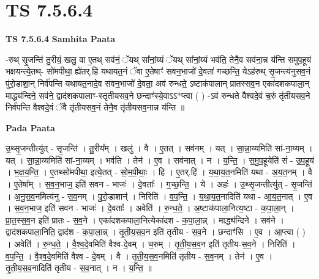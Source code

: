 \documentclass[17pt]{extarticle}
\begin{document}
\section*{ TS 7.5.6.4 }

\textbf{TS 7.5.6.4 } \newline
\textbf{Samhita Paata} \newline

-रुथ् सृ॒जन्ति॑ तु॒रीयं॒ खलु॒ वा ए॒तथ् सव॑नं॒ ॅयथ् सा᳚नां॒य्यं ॅयथ् सा᳚नां॒य्यं भव॑ति॒ तेनै॒व सव॑ना॒न्न य॑न्ति समुप॒हूय॑ भक्षयन्त्ये॒तथ्- सो॑मपीथा॒ ह्ये॑तर्.हि॑ यथायत॒नं ॅवा ए॒तेषाꣳ॑ सवन॒भाजो॑ दे॒वता॑ गच्छन्ति॒ येऽह॑रुथ् सृ॒जन्त्य॑नुसव॒नं पु॑रो॒डाशा॒न् निर्व॑पन्ति यथायत॒नादे॒व स॑वन॒भाजो॑ दे॒वता॒ अव॑ रुन्धते॒ ऽष्टाक॑पालान् प्रातस्सव॒न एका॑दशकपाला॒न् माद्ध्य॑न्दिने॒ सव॑ने॒ द्वाद॑शकपालाꣳ-स्तृतीयसव॒ने छन्दाꣳ॑स्ये॒वाऽऽ*प्त्वा ( ) -ऽव॑ रुन्धते वैश्वदे॒वं च॒रुं तृ॑तीयसव॒ने निर्व॑पन्ति वैश्वदे॒वं ॅवै तृ॑तीयसव॒नं तेनै॒व तृ॑तीयसव॒नान्न य॑न्ति ॥ \newline

\textbf{Pada Paata} \newline

उ॒थ्सृ॒जन्तीत्यु॑त् - सृ॒जन्ति॑ । तु॒रीय᳚म् । खलु॑ । वै । ए॒तत् । सव॑नम् । यत् । सा॒न्ना॒य्यमिति॑ सां-ना॒य्यम् । यत् । सा॒न्ना॒य्यमिति॑ सां-ना॒य्यम् । भव॑ति । तेन॑ । ए॒व । सव॑नात् । न । य॒न्ति॒ । स॒मु॒प॒हूयेति॑ सं - उ॒प॒हूय॑ । भ॒क्ष॒य॒न्ति॒ । ए॒तथ्सो॑मपीथा॒ इत्ये॒तत् - सो॒म॒पी॒थाः॒ । हि । ए॒तर्.हि॑ । य॒था॒य॒त॒नमिति॑ यथा - अ॒य॒त॒नम् । वै । ए॒तेषा᳚म् । स॒व॒न॒भाज॒ इति॑ सवन - भाजः॑ । दे॒वताः᳚ । ग॒च्छ॒न्ति॒ । ये । अहः॑ । उ॒थ्सृ॒जन्तीत्यु॑त् - सृ॒जन्ति॑ । अ॒नु॒स॒व॒नमित्य॑नु - स॒व॒नम् । पु॒रो॒डाशान्॑ । निरिति॑ । व॒प॒न्ति॒ । य॒था॒य॒त॒नादिति॑ यथा - आ॒य॒त॒नात् । ए॒व । स॒व॒न॒भाज॒ इति॑ सवन - भाजः॑ । दे॒वताः᳚ । अवेति॑ । रु॒न्ध॒ते॒ । अ॒ष्टाक॑पाला॒नित्य॒ष्टा - क॒पा॒ला॒न् । प्रा॒त॒स्स॒व॒न इति॑ प्रातः - स॒व॒ने । एका॑दशकपाला॒नित्येका॑दश - क॒पा॒ला॒न्न् । माद्ध्य॑न्दिने । सव॑ने । द्वाद॑शकपाला॒निति॒ द्वाद॑श - क॒पा॒ला॒न्न् । तृ॒ती॒य॒स॒व॒न इति॑ तृतीय - स॒व॒ने । छन्दाꣳ॑सि । ए॒व । आ॒प्त्वा ( ) । अवेति॑ । रु॒न्ध॒ते॒ । वै॒श्व॒दे॒वमिति॑ वैश्व-दे॒वम् । च॒रुम् । तृ॒ती॒य॒स॒व॒न इति॑ तृतीय-स॒व॒ने । निरिति॑ । व॒प॒न्ति॒ । वै॒श्व॒दे॒वमिति॑ वैश्व - दे॒वम् । वै । तृ॒ती॒य॒स॒व॒नमिति॑ तृतीय - स॒व॒नम् । तेन॑ । ए॒व । तृ॒ती॒य॒स॒व॒नादिति॑ तृतीय - स॒व॒नात् । न । य॒न्ति॒ ॥  \newline




\end{document}
